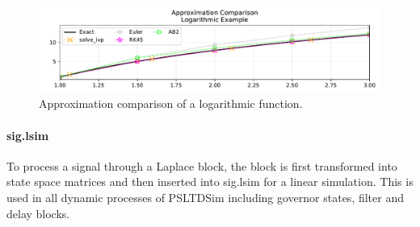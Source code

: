 \documentclass[12pt]{article}
\begin{document}
\begin{figure}[H]
	\centering
	\footnotesize
	\includegraphics[width=\linewidth]{figures/logEx}
	\caption{Approximation comparison of a logarithmic function.}
	\label{fig: log ex}
\end{figure}







\paragraph{sig.lsim}
To process a signal through a Laplace block, the block is first transformed into state space matrices and then inserted into sig.lsim for a linear simulation.
This is used in all dynamic processes of PSLTDSim including governor states, filter and delay blocks.

\end{document}

